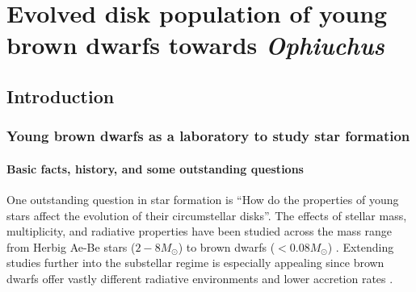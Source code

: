 \chapter{Evolved disk population of young brown dwarfs towards \emph{Ophiuchus}}

\section{Introduction}

\subsection{Young brown dwarfs as a laboratory to study star formation}

\subsubsection{Basic facts, history, and some outstanding questions}
One outstanding question in star formation is ``How do the properties of young stars affect the evolution of their circumstellar disks''.  The effects of stellar mass, multiplicity, and radiative properties have been studied across the mass range from Herbig Ae-Be stars ($2-8 M_{\odot}$) to brown dwarfs ($<0.08 M_{\odot}$) \citep{2011ARA&A..49...67W}.  Extending studies further into the substellar regime is especially appealing since brown dwarfs offer vastly different radiative environments and lower accretion rates \citep{2003ApJ...592..266M,2009ApJ...696.1589H}.



